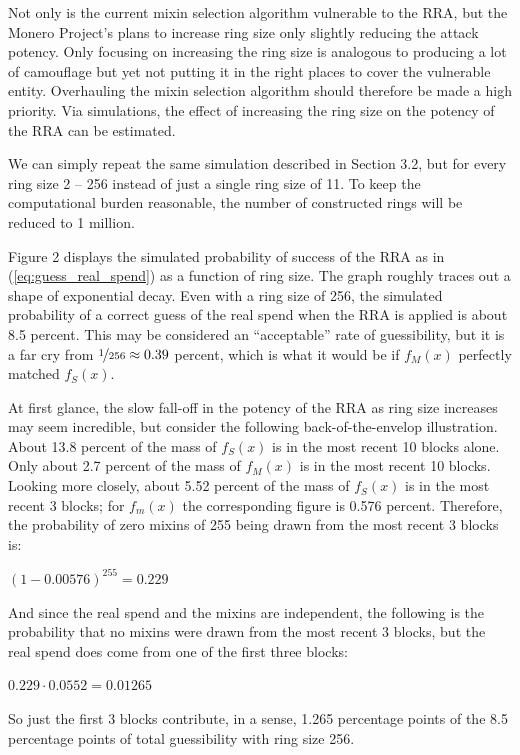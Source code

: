 \documentclass[english]{paper}
\begin{document}
Not only is the current mixin selection algorithm vulnerable to the
RRA, but the Monero Project's plans to increase ring size only slightly
reducing the attack potency. Only focusing on increasing the ring
size is analogous to producing a lot of camouflage but yet not putting
it in the right places to cover the vulnerable entity. Overhauling
the mixin selection algorithm should therefore be made a high priority.
Via simulations, the effect of increasing the ring size on the potency
of the RRA can be estimated. 

We can simply repeat the same simulation described in Section 3.2,
but for every ring size 2 -- 256 instead of just a single ring size
of 11. To keep the computational burden reasonable, the number of
constructed rings will be reduced to 1 million.

Figure 2 displays the simulated probability of success of the RRA
as in (\ref{eq:guess_real_spend}) as a function of ring size. The
graph roughly traces out a shape of exponential decay. Even with a
ring size of 256, the simulated probability of a correct guess of
the real spend when the RRA is applied is about 8.5 percent. This
may be considered an ``acceptable'' rate of guessibility, but it
is a far cry from $\nicefrac{1}{256}\approx0.39$ percent, which is
what it would be if $f_{M}(x)$ perfectly matched $f_{S}(x)$.

At first glance, the slow fall-off in the potency of the RRA as ring
size increases may seem incredible, but consider the following back-of-the-envelop
illustration. About 13.8 percent of the mass of $f_{S}(x)$ is in
the most recent 10 blocks alone. Only about 2.7 percent of the mass
of $f_{M}(x)$ is in the most recent 10 blocks. Looking more closely,
about 5.52 percent of the mass of $f_{S}(x)$ is in the most recent
3 blocks; for $f_{m}(x)$ the corresponding figure is 0.576 percent.
Therefore, the probability of zero mixins of 255 being drawn from
the most recent 3 blocks is:

$(1-0.00576)^{255}=0.229$

And since the real spend and the mixins are independent, the following
is the probability that no mixins were drawn from the most recent
3 blocks, but the real spend does come from one of the first three
blocks:

$0.229\cdot0.0552=0.01265$

So just the first 3 blocks contribute, in a sense, 1.265 percentage
points of the 8.5 percentage points of total guessibility with ring
size 256.
\end{document}
